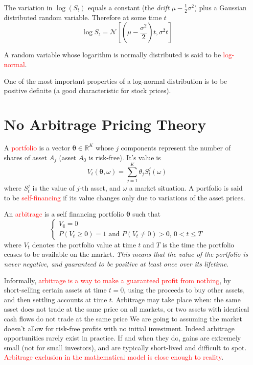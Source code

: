 \documentclass[12pt,a4paper]{article}
\begin{document}
The variation in $\log(S_t)$ equals a constant (the \emph{drift} $\mu-\frac{1}{2}\sigma^2$) plus a Gaussian distributed random variable. Therefore at some time $t$
\begin{equation*}
\log S_t = \mathcal{N}\left[\left(\mu -\frac{\sigma^2}{2}\right)t, \sigma^2 t\right]
\end{equation*}

A random variable whose logarithm is normally distributed is said to be \textcolor{red}{log-normal}.
			
One of the most important properties of a log-normal distribution is to be positive definite (a good characteristic for stock prices).
	
\clearpage
\section{No Arbitrage Pricing Theory}

A \textcolor{red}{portfolio} is a vector $\mathbf{\theta}\in \mathbb{R}^K$ whose $j$ components represent the number of shares of asset $A_j$ (asset $A_0$ is risk-free). It's value is
\begin{equation}
V_t(\mathbf{\theta}, \omega)=\sum_{j=1}^K\theta_jS^j_t(\omega)
\end{equation} 
where $S_t^j$ is the value of $j$-th asset, and $\omega$ a market situation. A portfolio is said to be \textcolor{red}{self-financing} if its value changes only due to variations of the asset prices.

An \textcolor{red}{arbitrage} is a self financing portfolio $\mathbf{\theta}$ such that
\begin{equation}
\begin{cases}
V_0 = 0 \\
P(V_{t}\geq 0)=1\text{ and }P(V_{t}\neq 0)>0,\,0<t\leq T
\end{cases}
\end{equation}
where $V_t$ denotes the portfolio value at time $t$ and $T$ is the time the portfolio ceases to be available on the market. 
\emph{This means that the value of the portfolio is never negative, and guaranteed to be positive at least once over its lifetime.}

Informally, \textcolor{red}{arbitrage is a way to make a guaranteed profit from nothing}, by short-selling certain assets at time $t = 0$, using the proceeds to buy other assets, and then settling accounts at time $t$. 
Arbitrage may take place when: the same asset does not trade at the same price on all markets, or two assets with identical cash flows do not trade at the same price
We are going to assuming the market doesn't allow for risk-free profits with no initial investment.
Indeed arbitrage opportunities rarely exist in practice. If and when they do, gains are extremely small (not for small investors), and are typically short-lived and difficult to spot. 
\textcolor{red}{Arbitrage exclusion in the mathematical model is close enough to reality}.
\end{document}

